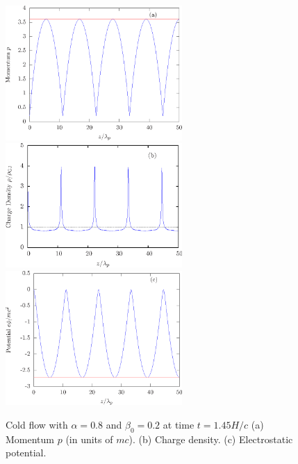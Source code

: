 \begin{figure}%
\begin{center}
\includegraphics[width=0.6\textwidth]{pics/chap2/f3a.eps}\\
\includegraphics[width=0.6\textwidth]{pics/chap2/f3b.eps}\\
\includegraphics[width=0.6\textwidth]{pics/chap2/f3c.eps}
\caption[Snapshot of a cold flow with $\alpha < 0$]{Cold flow with $\alpha=0.8$ and $\beta_0=0.2$ at time $t=1.45H/c$
(a) Momentum $p$ (in units of $mc$). (b) Charge density.
(c) Electrostatic potential.
}
\label{fig:alpha0.8cold}
\end{center}
\end{figure}

